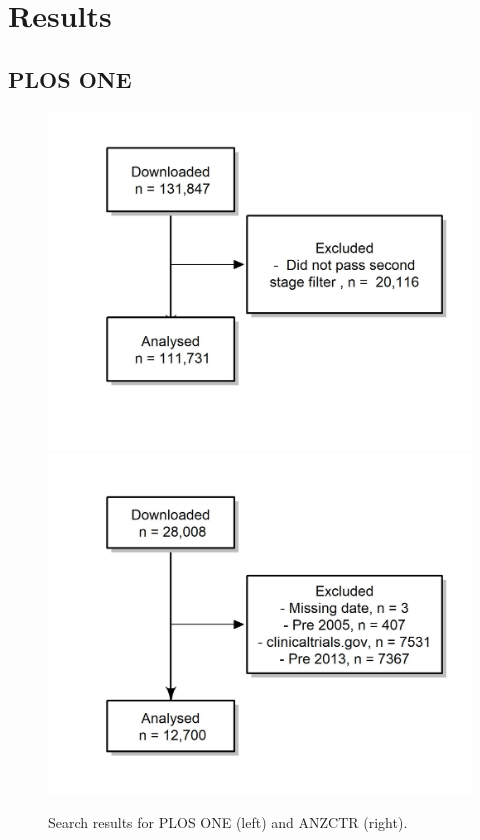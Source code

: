 \documentclass[12pt]{article}
\begin{document}
\hypertarget{results}{%
\section{Results}\label{results}}

\hypertarget{plos-one}{%
\subsection{PLOS ONE}\label{plos-one}}

\begin{figure}

{\centering \includegraphics[width=0.49\linewidth]{figures/excluded_plosone} \includegraphics[width=0.49\linewidth]{figures/excluded_anzctr_missing} 

}

\caption{\label{fig:consort-diagrams}Search results for PLOS ONE (left) and ANZCTR (right).}\label{fig:unnamed-chunk-3}
\end{figure}
\end{document}

